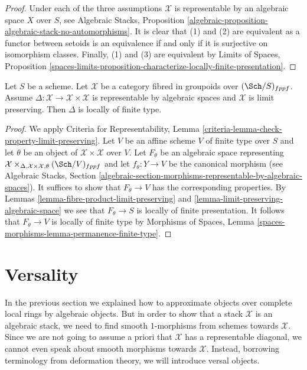 \begin{proof}
Under each of the three assumptions $\mathcal{X}$ is representable
by an algebraic space $X$ over $S$, see Algebraic Stacks, Proposition
\ref{algebraic-proposition-algebraic-stack-no-automorphisms}.
It is clear that (1) and (2) are equivalent as a functor between
setoids is an equivalence if and only if it is surjective on isomorphism
classes. Finally, (1) and (3) are equivalent by
Limits of Spaces, Proposition
\ref{spaces-limits-proposition-characterize-locally-finite-presentation}.
\end{proof}

\begin{lemma}
\label{lemma-diagonal}
Let $S$ be a scheme. Let $\mathcal{X}$ be a category fibred
in groupoids over $(\Sch/S)_{fppf}$. Assume
$\Delta : \mathcal{X} \to \mathcal{X} \times \mathcal{X}$ is
representable by algebraic spaces and $\mathcal{X}$ is limit preserving.
Then $\Delta$ is locally of finite type.
\end{lemma}

\begin{proof}
We apply Criteria for Representability, Lemma
\ref{criteria-lemma-check-property-limit-preserving}.
Let $V$ be an affine scheme $V$ of finite type over $S$
and let $\theta$ be an object of $\mathcal{X} \times \mathcal{X}$
over $V$. Let $F_\theta$ be an algebraic space representing
$\mathcal{X} \times_{\Delta, \mathcal{X} \times \mathcal{X}, \theta}
(\Sch/V)_{fppf}$ and let $f_\theta : Y \to V$ be the canonical morphism
(see Algebraic Stacks, Section
\ref{algebraic-section-morphisms-representable-by-algebraic-spaces}).
It suffices to show that
$F_\theta \to V$ has the corresponding properties. By
Lemmas \ref{lemma-fibre-product-limit-preserving} and
\ref{lemma-limit-preserving-algebraic-space}
we see that $F_\theta \to S$ is locally of finite presentation.
It follows that $F_\theta \to V$ is locally of finite type
by Morphisms of Spaces, Lemma
\ref{spaces-morphisms-lemma-permanence-finite-type}.
\end{proof}






\section{Versality}
\label{section-versality}

\noindent
In the previous section we explained how to approximate objects over
complete local rings by algebraic objects. But in order to show that
a stack $\mathcal{X}$ is an algebraic stack, we need to find smooth
$1$-morphisms from schemes towards $\mathcal{X}$. Since we are not going
to assume a priori that $\mathcal{X}$ has a representable diagonal, we
cannot even speak about smooth morphisms towards $\mathcal{X}$. Instead,
borrowing terminology from deformation theory, we will introduce versal
objects.

